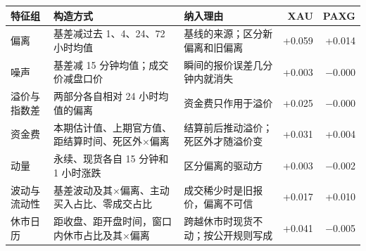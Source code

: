 \begin{tabular}{>{\raggedright\arraybackslash}p{2.0cm}>{\raggedright\arraybackslash}p{6.2cm}>{\raggedright\arraybackslash}p{5.6cm}rr}
\toprule
特征组 & 构造方式 & 纳入理由 & XAU & PAXG \\
\midrule
偏离 & 基差减过去 1、4、24、72 小时均值 & 基线的来源；区分新偏离和旧偏离 & +0.059 & +0.014 \\
噪声 & 基差减 15 分钟均值；成交价减盘口价 & 瞬间的报价误差几分钟内就消失 & +0.003 & −0.000 \\
溢价与指数差 & 两部分各自相对 24 小时均值的偏离 & 资金费只作用于溢价 & +0.025 & −0.000 \\
资金费 & 本期估计值、上期官方值、距结算时间、死区外×偏离 & 结算前后推动溢价；死区外才随溢价变 & +0.031 & +0.004 \\
动量 & 永续、现货各自 15 分钟和 1 小时涨跌 & 区分偏离的驱动方 & +0.003 & −0.002 \\
波动与流动性 & 基差波动及其×偏离、主动买入占比、零成交占比 & 成交稀少时是旧报价，偏离不可信 & +0.017 & +0.010 \\
休市日历 & 距收盘、距开盘时间，窗口内休市占比及其×偏离 & 跨越休市时现货不动；按公开规则写成 & +0.041 & −0.005 \\
\bottomrule
\end{tabular}
